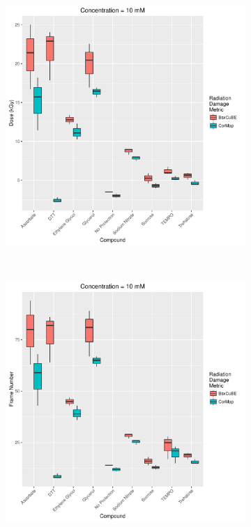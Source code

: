     \\
\begin{figure}
    \ContinuedFloat
    \centering
    \begin{subfigure}[b]{0.72\textwidth}
            \centering
            \includegraphics[width=\textwidth]{figures/saxs/Conc_10_dose.pdf}
            \caption{}
            \label{fig:SAXS dose- 10mM}
    \end{subfigure}
    \\
    \begin{subfigure}[b]{0.72\textwidth}
            \centering
            \includegraphics[width=\textwidth]{figures/saxs/Conc_10_frame_num.pdf}

\end{subfigure}
\end{figure}
